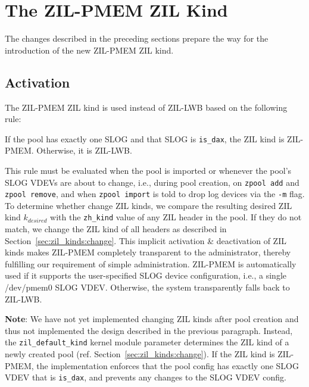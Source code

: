 \documentclass[12pt,a4paper,twoside]{book}
\begin{document}
\section{The ZIL-PMEM ZIL Kind}\label{sec:zilpmemzilkind}
The changes described in the preceding sections prepare the way for the introduction of the new ZIL-PMEM ZIL kind.

\subsection{Activation}\label{sec:zilpmemzilkind:activation}
The ZIL-PMEM ZIL kind is used instead of ZIL-LWB based on the following rule:
\begin{displayquote}
  If the pool has exactly one SLOG and that SLOG is \lstinline{is_dax}, the ZIL kind is ZIL-PMEM. Otherwise, it is ZIL-LWB.
\end{displayquote}
This rule must be evaluated when the pool is imported or whenever the pool's SLOG VDEVs are about to change, i.e.,
during pool creation, on \lstinline{zpool add} and \lstinline{zpool remove}, and when \lstinline{zpool import} is told to drop log devices via the \lstinline{-m} flag.
To determine whether change ZIL kinds, we compare the resulting desired ZIL kind $k_{desired}$ with the \lstinline{zh_kind} value of any ZIL header in the pool.
If they do not match, we change the ZIL kind of all headers as described in Section~\ref{sec:zil_kinds:change}.
This implicit activation \& deactivation of ZIL kinds makes ZIL-PMEM completely transparent to the administrator, thereby fulfilling our requirement of simple administration.
ZIL-PMEM is automatically used if it supports the user-specified SLOG device configuration, i.e., a single /dev/pmem0 SLOG VDEV.
Otherwise, the system transparently falls back to ZIL-LWB.

\textbf{Note}: We have not yet implemented changing ZIL kinds after pool creation and thus not implemented the design described in the previous paragraph.
Instead, the \lstinline{zil_default_kind} kernel module parameter determines the ZIL kind of a newly created pool (ref. Section~\ref{sec:zil_kinds:change}).
If the ZIL kind is ZIL-PMEM, the implementation enforces that the pool config has exactly one SLOG VDEV that is \lstinline{is_dax}, and prevents any changes to the SLOG VDEV config.
\end{document}
